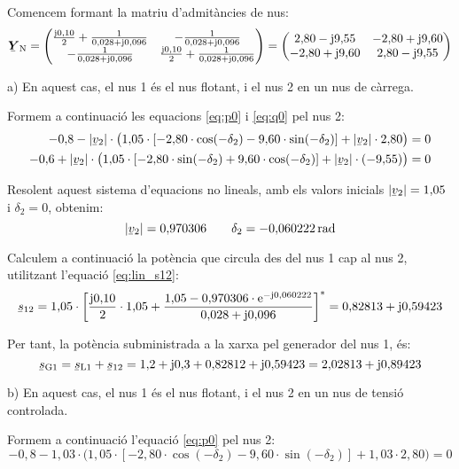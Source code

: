 \begin{exemple}
Comencem formant la matriu d'admit\`{a}ncies de nus:
\[
\mcmplx{Y}\ped{N} = \begin{pmatrix}
  \frac{\ju 0{,}10}{2} + \frac{1}{0{,}028+\ju0{,}096} & -\frac{1}{0{,}028+\ju0{,}096} \\
  -\frac{1}{0{,}028+\ju0{,}096} & \frac{\ju 0{,}10}{2} + \frac{1}{0{,}028+\ju0{,}096} \\
\end{pmatrix} =
\begin{pmatrix}
  2{,}80 -\ju9{,}55 & -2{,}80 +\ju9{,}60 \\
  -2{,}80 +\ju9{,}60 & 2{,}80 -\ju9{,}55 \\
\end{pmatrix}
\]

a) En aquest cas, el nus 1 \'{e}s el nus flotant, i el nus 2 en un nus
de c\`{a}rrega.

Formem a continuaci\'{o} les equacions \eqref{eq:p0} i \eqref{eq:q0} pel
nus 2:
\begin{align*}
-0{,}8 - |\cmplx{v}_2| \cdot \bigl( 1{,}05\cdot [-2{,}80\cdot \cos(-\delta_2) - 9{,}60 \cdot
\sin( -\delta_2)]  + |\cmplx{v}_2| \cdot 2{,}80 \bigr) &= 0 \\
-0{,}6 + |\cmplx{v}_2| \cdot\bigl( 1{,}05 \cdot[-2{,}80\cdot\sin(-\delta_2) +
9{,}60\cdot\cos( -\delta_2)]  + |\cmplx{v}_2|\cdot (-9{,}55) \bigr) &= 0
\end{align*}

Resolent aquest sistema d'equacions no lineals, amb els valors inicials $|\cmplx{v}_2|=1{,}05$ i $\delta_2=0$, obtenim:
\[ |\cmplx{v}_2|=0{,}970306 \qquad \delta_2=-0{,}060222\unit{rad} \]

Calculem a continuaci\'{o} la pot\`{e}ncia que circula des del nus 1 cap al
nus 2, utilitzant l'equaci\'{o} \eqref{eq:lin_s12}:
\[
\cmplx{s}_{12} = 1{,}05\cdot \left[ \frac{\ju0{,}10}{2} \cdot1{,}05 + \frac{ 1{,}05 -
0{,}970306\cdot\eu^{-\ju0{,}060222}} {0{,}028+\ju0{,}096} \right]^* = 0{,}82813 + \ju
0{,}59423
\]

Per tant, la pot\`{e}ncia subministrada a la xarxa pel generador del nus
1, \'{e}s:
\[ \cmplx{s}\ped{G1} = \cmplx{s}\ped{L1} + \cmplx{s}_{12} = 1{,}2+\ju0{,}3 + 0{,}82812 + \ju 0{,}59423 = 2{,}02813 + \ju 0{,}89423 \]

b) En aquest cas, el nus 1 \'{e}s el nus flotant, i el nus 2 en un nus
de tensi\'{o} controlada.

Formem a continuaci\'{o} l'equaci\'{o} \eqref{eq:p0} pel nus 2:
\[
-0{,}8 - 1{,}03\cdot \bigl( 1{,}05\cdot [-2{,}80\cdot\cos(-\delta_2) - 9{,}60\cdot\sin(
-\delta_2)] + 1{,}03\cdot 2{,}80 \bigr) = 0
\]


\end{exemple}
